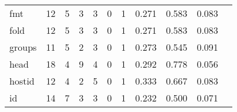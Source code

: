 \begin{longtable}{lp{1.20cm}p{1.20cm}p{1.20cm}p{1.20cm}p{1.20cm}p{1.20cm}p{1.20cm}p{1.20cm}p{1.20cm}p{1.20cm}}
fmt       &                                    12 &                                                  5 &                                                  3 &                                                  3 &                                                  0 &                                                  1 &                                         0.271 &                                              0.583 &                                              0.083 \\
fold      &                                    12 &                                                  5 &                                                  3 &                                                  3 &                                                  0 &                                                  1 &                                         0.271 &                                              0.583 &                                              0.083 \\
groups    &                                    11 &                                                  5 &                                                  2 &                                                  3 &                                                  0 &                                                  1 &                                         0.273 &                                              0.545 &                                              0.091 \\
head      &                                    18 &                                                  4 &                                                  9 &                                                  4 &                                                  0 &                                                  1 &                                         0.292 &                                              0.778 &                                              0.056 \\
hostid    &                                    12 &                                                  4 &                                                  2 &                                                  5 &                                                  0 &                                                  1 &                                         0.333 &                                              0.667 &                                              0.083 \\
id        &                                    14 &                                                  7 &                                                  3 &                                                  3 &                                                  0 &                                                  1 &                                         0.232 &                                              0.500 &                                              0.071 \\

\end{longtable}
